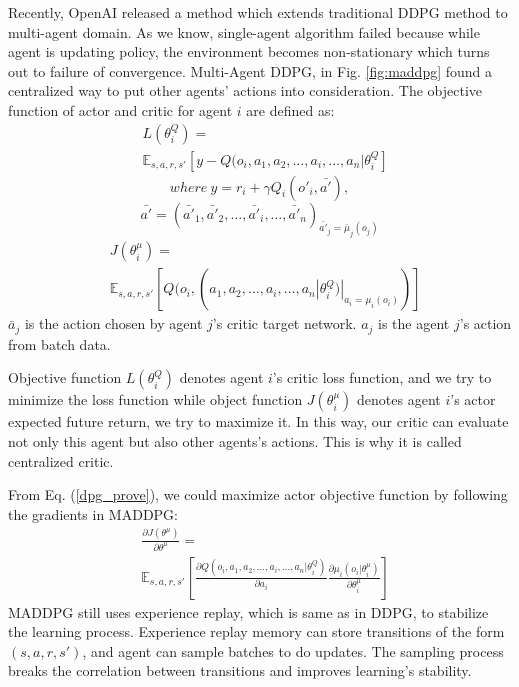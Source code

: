 \documentclass[11pt,twocolumn]{jarticle} %
\begin{document}
Recently, OpenAI released a method which extends traditional DDPG method to multi-agent domain\cite{maddpg}. As we know, single-agent algorithm failed because while agent is updating policy, the environment becomes non-stationary which turns out to failure of convergence. Multi-Agent DDPG, in Fig. \ref{fig:maddpg} found a centralized way to put other agents’ actions into consideration. The objective function of actor and critic for agent $i$ are defined as:
\begin{equation}
\begin{split}
& L(\theta^Q_i) =  \\
& \mathbb{E}_{s,a,r,s'}[y - Q(o_i, a_1, a_2, \ldots, a_i ,\ldots, a_n|\theta^Q_i] 
\end{split}
\end{equation}
$$where\ y = r_i + \gamma{Q_i}(o'_i, \bar{a'}),$$
$$ \bar{a'} = (\bar{a'}_1, \bar{a'}_2, \ldots, \bar{a'}_i ,\ldots, \bar{a'}_n)_{\bar{a'}_j = \bar{\mu}_j(o_j)}$$
\begin{equation}
\begin{split}
& J(\theta^\mu_i) = \\
& \mathbb{E}_{s,a,r,s'}[Q(o_i, (a_1, a_2, \ldots, a_i ,\ldots, a_n|\theta^Q_i) | _{a_i = \mu_i(o_i)})] 
\end{split}
\end{equation}
$\bar{a}_j$ is the action chosen by agent $j$'s critic target network. $a_j$ is the agent $j$'s action from batch data. \par
Objective function $L(\theta^Q_i)$ denotes agent $i$'s critic loss function, and we try to minimize the loss function while object function $J(\theta^\mu_i)$ denotes agent $i$'s actor expected future return, we try to maximize it. In this way, our critic can evaluate not only this agent but also other agents's actions. This is why it is called centralized critic. \par
From Eq. (\ref{dpg_prove}), we could maximize actor objective function by following the gradients in MADDPG:
\begin{equation}
\begin{split}
& \frac{\partial J(\theta^\mu)}{\partial \theta^\mu} = \\
& \mathbb{E}_{s,a,r,s'}[\frac{\partial Q(o_i, a_1, a_2, \ldots, a_i ,\ldots, a_n|\theta^Q_i)}{\partial a_i} \frac{\partial \mu_i(o_i|\theta^\mu_i)}{\partial \theta^\mu_i}]
\end{split}
\end{equation}
MADDPG still uses experience replay, which is same as in DDPG, to stabilize the learning process. Experience replay\cite{replay} memory can store transitions of the form $(s,a,r,s')$, and agent can sample batches to do updates. The sampling process breaks the correlation between transitions and improves learning's stability. \par
\end{document}
